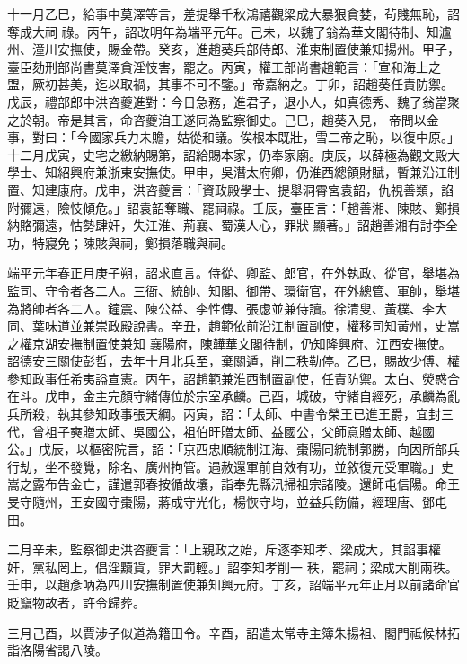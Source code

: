 \begin{pinyinscope}
 十一月乙巳，給事中莫澤等言，差提舉千秋鴻禧觀梁成大暴狠貪婪，茍賤無恥，詔奪成大祠
 祿。丙午，詔改明年為端平元年。己未，以魏了翁為華文閣待制、知瀘州、潼川安撫使，賜金帶。癸亥，進趙葵兵部侍郎、淮東制置使兼知揚州。甲子，臺臣劾刑部尚書莫澤貪淫忮害，罷之。丙寅，權工部尚書趙範言：「宣和海上之盟，厥初甚美，迄以取禍，其事不可不鑒。」帝嘉納之。丁卯，詔趙葵任責防禦。戊辰，禮部郎中洪咨夔進對：今日急務，進君子，退小人，如真德秀、魏了翁當聚之於朝。帝是其言，命咨夔洎王遂同為監察御史。己巳，趙葵入見，
 帝問以金事，對曰：「今國家兵力未贍，姑從和議。俟根本既壯，雪二帝之恥，以復中原。」十二月戊寅，史宅之繳納賜第，詔給賜本家，仍奉家廟。庚辰，以薛極為觀文殿大學士、知紹興府兼浙東安撫使。甲申，吳潛太府卿，仍淮西總領財賦，暫兼沿江制置、知建康府。戊申，洪咨夔言：「資政殿學士、提舉洞霄宮袁韶，仇視善類，諂附彌遠，險忮傾危。」詔袁韶奪職、罷祠祿。壬辰，臺臣言：「趙善湘、陳賅、鄭損納賂彌遠，怙勢肆奸，失江淮、荊襄、蜀漢人心，罪狀
 顯著。」詔趙善湘有討李全功，特寢免；陳賅與祠，鄭損落職與祠。



 端平元年春正月庚子朔，詔求直言。侍從、卿監、郎官，在外執政、從官，舉堪為監司、守令者各二人。三衙、統帥、知閣、御帶、環衛官，在外總管、軍帥，舉堪為將帥者各二人。鐘震、陳公益、李性傳、張虙並兼侍讀。徐清叟、黃樸、李大同、葉味道並兼崇政殿說書。辛丑，趙範依前沿江制置副使，權移司知黃州，史嵩之權京湖安撫制置使兼知
 襄陽府，陳韡華文閣待制，仍知隆興府、江西安撫使。詔德安三關使彭哲，去年十月北兵至，棄關遁，削二秩勒停。乙巳，賜故少傅、權參知政事任希夷謚宣憲。丙午，詔趙範兼淮西制置副使，任責防禦。太白、熒惑合在斗。戊申，金主完顏守緒傳位於宗室承麟。己酉，城破，守緒自經死，承麟為亂兵所殺，執其參知政事張天綱。丙寅，詔：「太師、中書令榮王已進王爵，宜封三代，曾祖子奭贈太師、吳國公，祖伯旴贈太師、益國公，父師意贈太師、越國
 公。」戊辰，以樞密院言，詔：「京西忠順統制江海、棗陽同統制郭勝，向因所部兵行劫，坐不發覺，除名、廣州拘管。遇赦還軍前自效有功，並敘復元受軍職。」史嵩之露布告金亡，謹遣郭春按循故壤，詣奉先縣汛掃祖宗諸陵。還師屯信陽。命王旻守隨州，王安國守棗陽，蔣成守光化，楊恢守均，並益兵飭備，經理唐、鄧屯田。



 二月辛未，監察御史洪咨夔言：「上親政之始，斥逐李知孝、梁成大，其諂事權奸，黨私罔上，倡淫黷貨，罪大罰輕。」詔李知孝削一
 秩，罷祠；梁成大削兩秩。壬申，以趙彥吶為四川安撫制置使兼知興元府。丁亥，詔端平元年正月以前諸命官貶竄物故者，許令歸葬。



 三月己酉，以賈涉子似道為籍田令。辛酉，詔遣太常寺主簿朱揚祖、閣門祗候林拓詣洛陽省謁八陵。




\end{pinyinscope}
